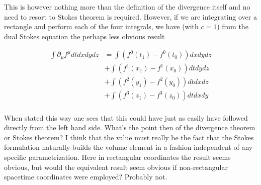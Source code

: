 This is however nothing more than the definition of the divergence itself and no need to resort to Stokes theorem is required.  However, if we are integrating over a rectangle and perform each of the four integrals, we have (with $c=1$) from the dual Stokes equation the perhaps less obvious result

\begin{align*}
\int \partial_\mu f^\mu dt dx dy dz
&=
\int (f^0(t_1) - f^0(t_0)) dx dy dz \\
&+\int (f^1(x_1) - f^1(x_0)) dt dy dz \\
&+\int (f^2(y_1) - f^2(y_0)) dt dx dz \\
&+\int (f^3(z_1) - f^3(z_0)) dt dx dy \\
\end{align*}

When stated this way one sees that this could have just as easily have followed directly from the left hand side.  What's the point then of the divergence theorem or Stokes theorem?  I think that the value must really be the fact that the Stokes formulation naturally builds the volume element in a fashion independent of any specific parametrization.  Here in rectangular coordinates the result seems obvious, but would the equivalent result seem obvious if non-rectangular spacetime coordinates were employed?  Probably not.

\EndArticle
